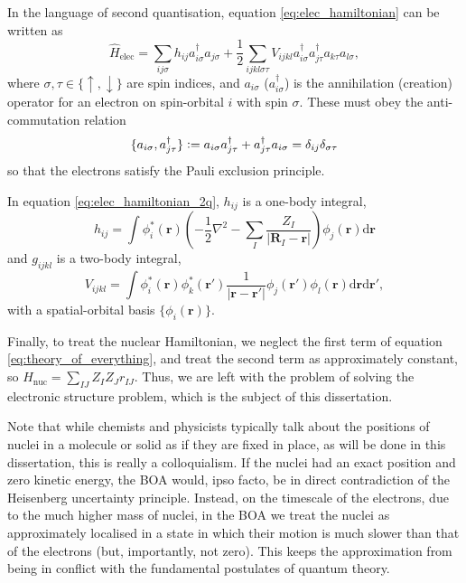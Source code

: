 In the language of second quantisation, equation \eqref{eq:elec_hamiltonian} can be written as
\begin{equation}
\label{eq:elec_hamiltonian_2q}
\hat H_\mathrm{elec} = \sum_{ij\sigma} h_{ij}a_{i\sigma}^\dag a_{j\sigma}+\frac 12 \sum_{ijkl\sigma\tau} V_{ijkl}a_{i\sigma}^\dag a_{j\tau}^\dag a_{k\tau}a_{l\sigma},
\end{equation}
where $\sigma,\tau\in\{\uparrow,\downarrow\}$ are spin indices, and $a_{i\sigma}$ ($a_{i\sigma}^\dag$) is the annihilation (creation) operator for an electron on spin-orbital $i$ with spin $\sigma$. These must obey the anti-commutation relation
\begin{equation}
    \{a_{i\sigma},a_{j\tau}^\dag\}
    \mathrel{\mathop:}=
    a_{i\sigma}a_{j\tau}^\dag + a_{j\tau}^\dag a_{i\sigma}
    =\delta_{ij}\delta_{\sigma\tau}
\end{equation}
so that the electrons satisfy the Pauli exclusion principle.

In equation \ref{eq:elec_hamiltonian_2q}, $h_{ij}$ is a one-body integral,
\begin{equation}
\label{eq:hij}
h_{ij} = \int \phi_i^*(\mathbf{r})\left(-\frac 12 \nabla^2 - \sum_I \frac{Z_I}{|\mathbf{R}_I-\mathbf r|}\right)\phi_j(\mathbf{r})\mathrm{d}\mathbf{r}
\end{equation}
and $g_{ijkl}$ is a two-body integral,
\begin{equation}
V_{ijkl} = \int \phi_i^*(\mathbf{r})\phi_k^*(\mathbf{r}')\frac{1}{|\mathbf{r}-\mathbf{r}'|}\phi_j(\mathbf{r}')\phi_l(\mathbf{r})\mathrm{d}\mathbf{r}\mathrm{d}\mathbf{r}',
\end{equation}
with a spatial-orbital basis $\{\phi_i(\mathbf{r})\}$.

Finally, to treat the nuclear Hamiltonian, we neglect the first term of equation \eqref{eq:theory_of_everything}, and treat the second term as approximately constant, so $\hat H_\mathrm{nuc} = \sum_{IJ} Z_IZ_Jr_{IJ}$. Thus, we are left with the problem of solving the electronic structure problem, which is the subject of this dissertation.

Note that while chemists and physicists typically talk about the positions of nuclei in a molecule or solid as if they are fixed in place, as will be done in this dissertation, this is really a colloquialism. If the nuclei had an exact position and zero kinetic energy, the \gls{BOA} would, ipso facto, be in direct contradiction of the Heisenberg uncertainty principle. Instead, on the timescale of the electrons, due to the much higher mass of nuclei, in the \gls{BOA} we treat the nuclei as approximately localised in a state in which their motion is much slower than that of the electrons (but, importantly, not zero). This keeps the approximation from being in conflict with the fundamental postulates of quantum theory.

